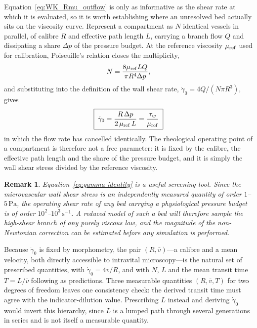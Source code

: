 \documentclass[lineno]{jfm}
\newtheorem{remark}{Remark}
\begin{document}
Equation~\eqref{eq:WK_Rmu_outflow} is only as informative as the shear rate at
which it is evaluated, so it is worth establishing where an unresolved bed
actually sits on the viscosity curve. Represent a compartment as $N$ identical
vessels in parallel, of calibre $R$ and effective path length $L$, carrying a
branch flow $Q$ and dissipating a share $\Delta p$ of the pressure budget. At the
reference viscosity $\mu_{\rm ref}$ used for calibration, Poiseuille's relation
closes the multiplicity,
\begin{equation}
N=\frac{8\mu_{\rm ref}LQ}{\pi R^{4}\Delta p},
\label{eq:bed-multiplicity}
\end{equation}
and substituting into the definition of the wall shear rate,
$\dot{\gamma}_{0}=4Q/(N\pi R^{3})$, gives
\begin{equation}
\boxed{\;\dot{\gamma}_{0}=\frac{R\,\Delta p}{2\,\mu_{\rm ref}\,L}
=\frac{\tau_{w}}{\mu_{\rm ref}}\;}
\label{eq:gamma-identity}
\end{equation}
in which the flow rate has cancelled identically. The rheological operating point
of a compartment is therefore not a free parameter: it is fixed by the calibre,
the effective path length and the share of the pressure budget, and it is simply
the wall shear stress divided by the reference viscosity.

\begin{remark}
Equation~\eqref{eq:gamma-identity} is a useful screening tool. Since the
microvascular wall shear stress is an independently measured quantity of order
$1$--$5\,\mathrm{Pa}$, the operating shear rate of any bed carrying a
physiological pressure budget is of order $10^{2}$--$10^{3}\,\mathrm{s}^{-1}$. A
reduced model of such a bed will therefore sample the high-shear branch of any
purely viscous law, and the magnitude of the non-Newtonian correction can be
estimated before any simulation is performed.
\end{remark}

Because $\dot{\gamma}_{0}$ is fixed by morphometry, the pair
$(R,\bar{v})$---a calibre and a mean velocity, both directly accessible to
intravital microscopy---is the natural set of prescribed quantities, with
$\dot{\gamma}_{0}=4\bar{v}/R$, and with $N$, $L$ and the mean transit time
$T=L/\bar{v}$ following as predictions. Three measurable quantities
$(R,\bar{v},T)$ for two degrees of freedom leaves one consistency check: the
derived transit time must agree with the indicator-dilution value. Prescribing
$L$ instead and deriving $\dot{\gamma}_{0}$ would invert this hierarchy, since
$L$ is a lumped path through several generations in series and is not itself a
measurable quantity.
\end{document}
